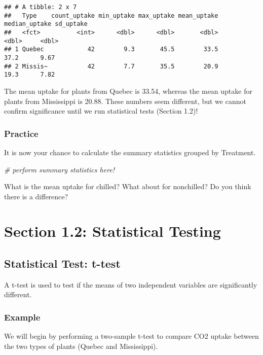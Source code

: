 \documentclass[
]{article}
\newenvironment{Shaded}{\begin{snugshade}}{\end{snugshade}}
\newcommand{\CommentTok}[1]{\textcolor[rgb]{0.56,0.35,0.01}{\textit{#1}}}
\begin{document}
\begin{verbatim}
## # A tibble: 2 x 7
##   Type    count_uptake min_uptake max_uptake mean_uptake median_uptake sd_uptake
##   <fct>          <int>      <dbl>      <dbl>       <dbl>         <dbl>     <dbl>
## 1 Quebec            42        9.3       45.5        33.5          37.2      9.67
## 2 Missis~           42        7.7       35.5        20.9          19.3      7.82
\end{verbatim}

The mean uptake for plants from Quebec is 33.54, whereas the mean uptake
for plants from Mississippi is 20.88. These numbers seem different, but
we cannot confirm significance until we run statistical tests (Section
1.2)!

\subsubsection{Practice}\label{practice}

It is now your chance to calculate the summary statistics grouped by
Treatment.

\begin{Shaded}
\begin{Highlighting}[]
\CommentTok{\# perform summary statistics here! }
\end{Highlighting}
\end{Shaded}

What is the mean uptake for chilled? What about for nonchilled? Do you
think there is a difference?

\section{Section 1.2: Statistical
Testing}\label{section-1.2-statistical-testing}

\subsection{Statistical Test: t-test}\label{statistical-test-t-test}

A t-test is used to test if the means of two independent variables are
significantly different.

\subsubsection{Example}\label{example-1}

We will begin by performing a two-sample t-test to compare CO2 uptake
between the two types of plants (Quebec and Mississippi).
\end{document}
